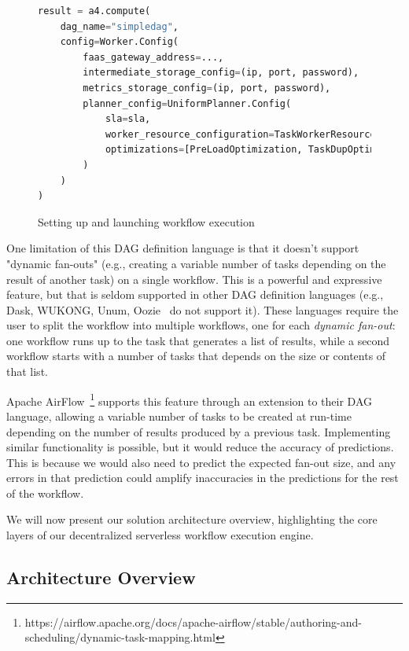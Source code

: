 \documentclass[conference]{IEEEtran}
\begin{document}
\begin{figure}[h]
\centering
\begin{lstlisting}[language=Python, basicstyle=\ttfamily\footnotesize, columns=fullflexible, breaklines=true]
result = a4.compute(
    dag_name="simpledag", 
    config=Worker.Config(
        faas_gateway_address=...,
        intermediate_storage_config=(ip, port, password),
        metrics_storage_config=(ip, port, password),
        planner_config=UniformPlanner.Config(
            sla=sla,
            worker_resource_configuration=TaskWorkerResourceConfiguration(cpus=3, memory_mb=512),
            optimizations=[PreLoadOptimization, TaskDupOptimization]
        )
    )
)
\end{lstlisting}
\caption{Setting up and launching workflow execution}
\label{lst:setup_and_launch_workflow_execution}
\end{figure}

One limitation of this DAG definition language is that it doesn't support "dynamic fan-outs" (e.g., creating a variable number of tasks depending on the result of another task) on a single workflow. This is a powerful and expressive feature, but that is seldom supported in other DAG definition languages (e.g., Dask, WUKONG, Unum, Oozie~\cite{apache_oozie} do not support it). These languages require the user to split the workflow into multiple workflows, one for each \textit{dynamic fan-out}: one workflow runs up to the task that generates a list of results, while a second workflow starts with a number of tasks that depends on the size or contents of that list. 

Apache AirFlow~\footnote{https://airflow.apache.org/docs/apache-airflow/stable/authoring-and-scheduling/dynamic-task-mapping.html} supports this feature through an extension to their DAG language, allowing a variable number of tasks to be created at run-time depending on the number of results produced by a previous task. Implementing similar functionality is possible, but it would reduce the accuracy of predictions. This is because we would also need to predict the expected fan-out size, and any errors in that prediction could amplify inaccuracies in the predictions for the rest of the workflow.

We will now present our solution architecture overview, highlighting the core layers of our decentralized serverless workflow execution engine.

\subsection{Architecture Overview}
\end{document}
